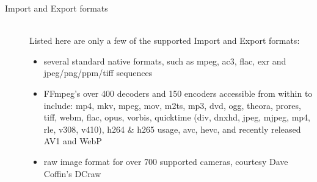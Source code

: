 \begin{description}
    \item[Import and Export formats]~\\
        Listed here are only a few of the supported Import and Export formats:
        \begin{itemize}
            \item  several standard native formats, such as mpeg, ac3, flac, exr and jpeg/png/ppm/tiff sequences
            \item FFmpeg’s over 400 decoders and 150 encoders accessible from within \CGG{} to include:
                mp4, mkv, mpeg, mov, m2ts, mp3, dvd, ogg, theora, prores, tiff, webm, flac, opus, vorbis,
                quicktime (div, dnxhd, jpeg, mjpeg, mp4, rle, v308, v410), h264 \& h265 usage, avc, hevc,
                and recently released AV1 and WebP
            \item raw image format for over 700 supported cameras, courtesy Dave Coffin's DCraw
        \end{itemize}


\end{description}
